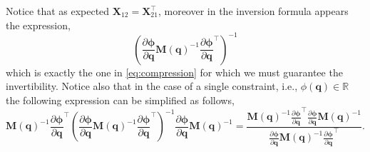 Notice that as expected $\bm{X}_{12} = \bm{X}_{21}^{\intercal}$,
moreover in the inversion formula appears the expression,
\begin{equation*}
  \left(\frac{\partial\bm{\phi}}{\partial\bm{q}}\bm{M}(\bm{q})^{-1}
  \frac{\partial\bm{\phi}}{\partial\bm{q}}^{\intercal}\right)^{-1}
\end{equation*}
which is exactly the one in \cref{eq:compression} for which we must
guarantee the invertibility.
Notice also that in the case of a single constraint,
i.e., $\phi(\bm{q})\in\mathbb{R}$ the following expression can be simplified as follows,
\begin{equation*}
  \bm{M(\bm{q})}^{-1}\frac{\partial\bm{\phi}}{\partial\bm{q}}^{\intercal}
  \left(\frac{\partial\bm{\phi}}{\partial\bm{q}}\bm{M}(\bm{q})^{-1}
  \frac{\partial\bm{\phi}}{\partial\bm{q}}^{\intercal}\right)^{-1}
  \frac{\partial\bm{\phi}}{\partial\bm{q}}\bm{M}(\bm{q})^{-1}
  = \frac{\bm{M(\bm{q})}^{-1}\frac{\partial\bm{\phi}}{\partial\bm{q}}^{\intercal}
  \frac{\partial\bm{\phi}}{\partial\bm{q}}\bm{M(\bm{q})}^{-1}}
  {\frac{\partial\bm{\phi}}{\partial\bm{q}}\bm{M}(\bm{q})^{-1}
  \frac{\partial\bm{\phi}}{\partial\bm{q}}^{\intercal}}.
\end{equation*}
